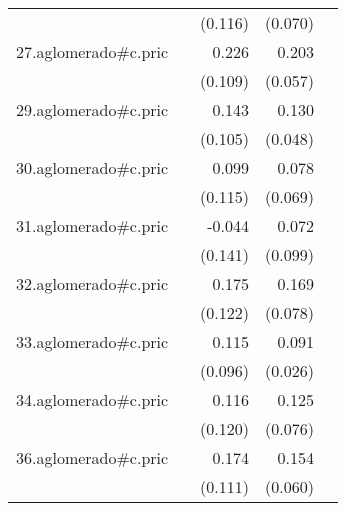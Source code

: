 {\begin{longtable}{l*{4}{D{.}{.}{-1}}}
            &                     &     (0.116)         &     (0.070)         &                     \\
\addlinespace
27.aglomerado#c.pric&                     &       0.226\sym{*}  &       0.203\sym{***}&                     \\
            &                     &     (0.109)         &     (0.057)         &                     \\
\addlinespace
29.aglomerado#c.pric&                     &       0.143         &       0.130\sym{**} &                     \\
            &                     &     (0.105)         &     (0.048)         &                     \\
\addlinespace
30.aglomerado#c.pric&                     &       0.099         &       0.078         &                     \\
            &                     &     (0.115)         &     (0.069)         &                     \\
\addlinespace
31.aglomerado#c.pric&                     &      -0.044         &       0.072         &                     \\
            &                     &     (0.141)         &     (0.099)         &                     \\
\addlinespace
32.aglomerado#c.pric&                     &       0.175         &       0.169\sym{*}  &                     \\
            &                     &     (0.122)         &     (0.078)         &                     \\
\addlinespace
33.aglomerado#c.pric&                     &       0.115         &       0.091\sym{***}&                     \\
            &                     &     (0.096)         &     (0.026)         &                     \\
\addlinespace
34.aglomerado#c.pric&                     &       0.116         &       0.125         &                     \\
            &                     &     (0.120)         &     (0.076)         &                     \\
\addlinespace
36.aglomerado#c.pric&                     &       0.174         &       0.154\sym{*}  &                     \\
            &                     &     (0.111)         &     (0.060)         &                     \\

\end{longtable}}
